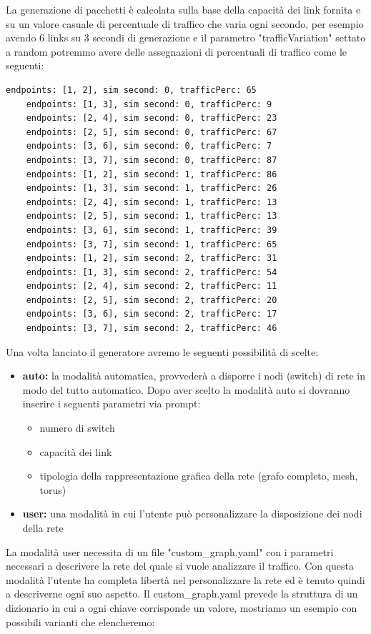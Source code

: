 \documentclass[binding=0.6cm]{sapthesis}
\begin{document}
La generazione di pacchetti è calcolata sulla base 
della capacità dei link fornita e su un valore casuale di percentuale di traffico 
che varia ogni secondo, per esempio avendo 6 links su 3 secondi di generazione e il 
parametro "trafficVariation" settato a random potremmo avere delle assegnazioni di 
percentuali di traffico come le seguenti:
{\scriptsize %
\begin{lstlisting}[caption={Esempio di variazione traffico casuale}]
    endpoints: [1, 2], sim second: 0, trafficPerc: 65
    endpoints: [1, 3], sim second: 0, trafficPerc: 9
    endpoints: [2, 4], sim second: 0, trafficPerc: 23
    endpoints: [2, 5], sim second: 0, trafficPerc: 67
    endpoints: [3, 6], sim second: 0, trafficPerc: 7
    endpoints: [3, 7], sim second: 0, trafficPerc: 87
    endpoints: [1, 2], sim second: 1, trafficPerc: 86
    endpoints: [1, 3], sim second: 1, trafficPerc: 26
    endpoints: [2, 4], sim second: 1, trafficPerc: 13
    endpoints: [2, 5], sim second: 1, trafficPerc: 13
    endpoints: [3, 6], sim second: 1, trafficPerc: 39
    endpoints: [3, 7], sim second: 1, trafficPerc: 65
    endpoints: [1, 2], sim second: 2, trafficPerc: 31
    endpoints: [1, 3], sim second: 2, trafficPerc: 54
    endpoints: [2, 4], sim second: 2, trafficPerc: 11
    endpoints: [2, 5], sim second: 2, trafficPerc: 20
    endpoints: [3, 6], sim second: 2, trafficPerc: 17
    endpoints: [3, 7], sim second: 2, trafficPerc: 46
\end{lstlisting}
}
Una volta lanciato il generatore avremo le seguenti possibilità di scelte:

\begin{itemize}
    \item \textbf{auto:} la modalità automatica, provvederà a disporre i nodi (switch) di rete in modo del
    tutto automatico. Dopo aver scelto la modalità auto si dovranno inserire i seguenti parametri via prompt:
    \begin{itemize}
        \item numero di switch
        \item capacità dei link
        \item tipologia della rappresentazione grafica della rete (grafo completo, mesh, torus)
    \end{itemize}
    \item \textbf{user:} una modalità in cui l'utente può personalizzare la disposizione dei nodi della rete
\end{itemize}
La modalità user necessita di un file "custom\_graph.yaml" con i parametri 
necessari a descrivere la rete del quale si vuole analizzare il traffico. 
Con questa modalità l'utente ha completa libertà nel personalizzare la rete ed 
è tenuto quindi a descriverne ogni suo aspetto. Il custom\_graph.yaml prevede la 
struttura di un dizionario in cui a ogni chiave corrisponde un valore, mostriamo un esempio con possibili varianti che elencheremo:
\end{document}
